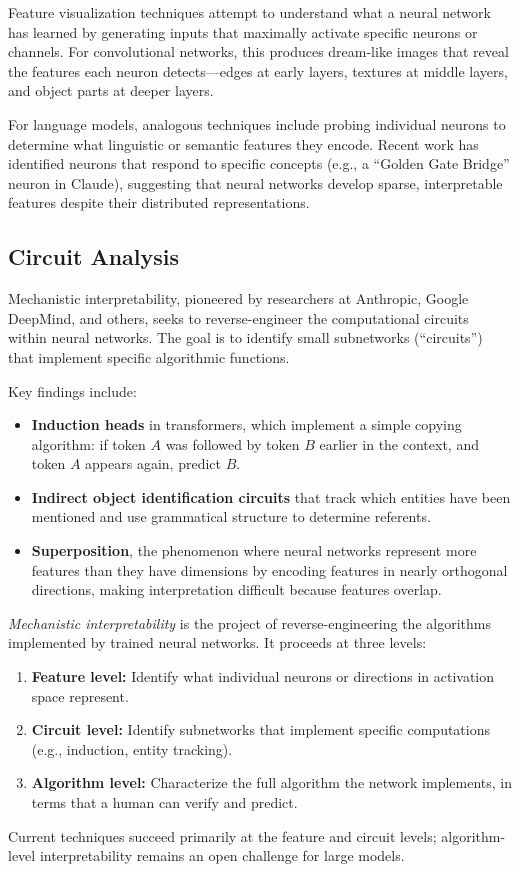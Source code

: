 Feature visualization techniques attempt to understand what a neural network has learned by generating inputs that maximally activate specific neurons or channels.
For convolutional networks, this produces dream-like images that reveal the features each neuron detects---edges at early layers, textures at middle layers, and object parts at deeper layers.

For language models, analogous techniques include probing individual neurons to determine what linguistic or semantic features they encode.
Recent work has identified neurons that respond to specific concepts (e.g., a ``Golden Gate Bridge'' neuron in Claude), suggesting that neural networks develop sparse, interpretable features despite their distributed representations.

\subsection{Circuit Analysis}

Mechanistic interpretability, pioneered by researchers at Anthropic, Google DeepMind, and others, seeks to reverse-engineer the computational circuits within neural networks.
The goal is to identify small subnetworks (``circuits'') that implement specific algorithmic functions.

Key findings include:
\begin{itemize}[leftmargin=1.5em]
  \item \textbf{Induction heads} in transformers, which implement a simple copying algorithm: if token $A$ was followed by token $B$ earlier in the context, and token $A$ appears again, predict $B$.
  \item \textbf{Indirect object identification circuits} that track which entities have been mentioned and use grammatical structure to determine referents.
  \item \textbf{Superposition}, the phenomenon where neural networks represent more features than they have dimensions by encoding features in nearly orthogonal directions, making interpretation difficult because features overlap.
\end{itemize}

\begin{dogmadef}
\emph{Mechanistic interpretability} is the project of reverse-engineering the algorithms implemented by trained neural networks.
It proceeds at three levels:
\begin{enumerate}[leftmargin=1.5em]
  \item \textbf{Feature level:} Identify what individual neurons or directions in activation space represent.
  \item \textbf{Circuit level:} Identify subnetworks that implement specific computations (e.g., induction, entity tracking).
  \item \textbf{Algorithm level:} Characterize the full algorithm the network implements, in terms that a human can verify and predict.
\end{enumerate}
Current techniques succeed primarily at the feature and circuit levels; algorithm-level interpretability remains an open challenge for large models.
\end{dogmadef}

